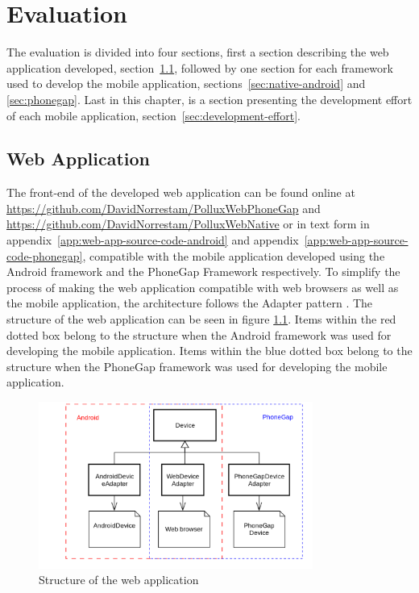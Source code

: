 \chapter{Evaluation}	\label{ch:evaluation}
The evaluation is divided into four sections, first a section describing the web application developed, section~\ref{sec:web-application}, followed by one section for each framework used to develop the mobile application, sections~\ref{sec:native-android} and \ref{sec:phonegap}. Last in this chapter, is a section presenting the development effort of each mobile application, section~\ref{sec:development-effort}.

\section{Web Application}\label{sec:web-application}
The front-end of the developed web application can be found online at \url{https://github.com/DavidNorrestam/PolluxWebPhoneGap} and \url{https://github.com/DavidNorrestam/PolluxWebNative}
or in text form in appendix~\ref{app:web-app-source-code-android} and appendix~\ref{app:web-app-source-code-phonegap}, compatible with the mobile application developed using the Android framework and the PhoneGap Framework respectively.
To simplify the process of making the web application compatible with web browsers as well as the mobile application, the architecture follows the Adapter pattern \cite[p.~317]{martin2003}. The structure of the web application can be seen in figure \ref{fig:webuml}. Items within the red dotted box belong to the structure when the Android framework was used for developing the mobile application. Items within the blue dotted box belong to the structure when the PhoneGap framework was used for developing the mobile application.

\begin{figure}[h!]
	\centering
    \includegraphics[width=90mm,natwidth=600,natheight=450]{./img/webuml.png}
    \caption{Structure of the web application}
	\label{fig:webuml}
\end{figure}

